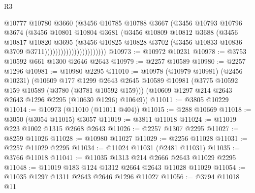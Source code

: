 \begin{lexlean}{R3}
\begin{coremodule}
                                    @10777
                                    @10780
                                    @3660
                                    (@3456
                                      @10785
                                      @10788
                                      @3667
                                      (@3456
                                        @10793
                                        @10796
                                        @3674
                                        (@3456
                                          @10801
                                          @10804
                                          @3681
                                          (@3456
                                            @10809
                                            @10812
                                            @3688
                                            (@3456
                                              @10817
                                              @10820
                                              @3695
                                              (@3456
                                                @10825
                                                @10828
                                                @3702
                                                (@3456
                                                  @10833
                                                  @10836
                                                  @3709
                                                  @3711)))))))))))))))))))))))
@10973 := @10972 @10231
@10978 := @3753 @10592 @661 @1300 @2646 @2643
@10979 := @2257 @10589
@10980 := @2257 @1296
@10981 := @10980 @2295
@11010 := @10978
    (@10979 @10981)
    (@2456 @10231)
    (@10609
      @177
      @1299
      @2643
      @2645
      @10589
      @10981
      (@3775 @10592 @159 @10589 (@3780 (@3781 @10592 @159)))
      (@10609 @1297 @214 @2643 @2643 @1296 @2295 (@10630 @1296) @10649))
@11011 := @3805 @10229
@11014 := @10973 (@11010 (@11011 @404))
@11015 := @288 @10669
@11018 := @3050 (@3054 @11015) @3057
@11019 := @3811 @11018
@11024 := @11019 @223 @1002 @1315 @2668 @2643
@11026 := @2257 @1307 @2295
@11027 := @8259 @11026
@11028 := @10980 @11027
@11029 := @2256 @11028
@11031 := @2257 @11029 @2295
@11034 := @11024 @11031 (@2481 @11031)
@11035 := @3766 @11018
@11041 := @11035 @1313 @214 @2666 @2643 @11029 @2295
@11048 := @11019 @183 @124 @1312 @2664 @2643 @11028 @11029
@11054 := @11035 @1297 @1311 @2643 @2646 @1296 @11027
@11056 := @3794 @11018 @11

\end{coremodule}
\end{lexlean}
